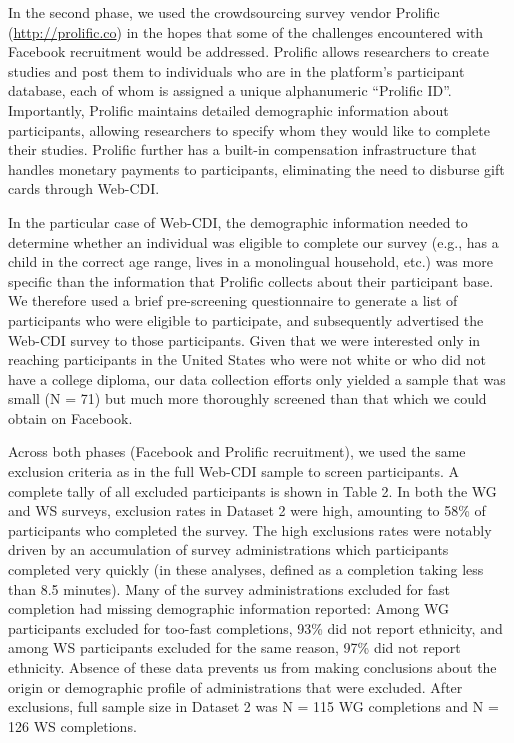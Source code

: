 \documentclass[
  english,
  ,man,floatsintext]{apa6}
\begin{document}
In the second phase, we used the crowdsourcing survey vendor Prolific (\url{http://prolific.co}) in the hopes that some of the challenges encountered with Facebook recruitment would be addressed. Prolific allows researchers to create studies and post them to individuals who are in the platform's participant database, each of whom is assigned a unique alphanumeric \enquote{Prolific ID}. Importantly, Prolific maintains detailed demographic information about participants, allowing researchers to specify whom they would like to complete their studies. Prolific further has a built-in compensation infrastructure that handles monetary payments to participants, eliminating the need to disburse gift cards through Web-CDI.

In the particular case of Web-CDI, the demographic information needed to determine whether an individual was eligible to complete our survey (e.g., has a child in the correct age range, lives in a monolingual household, etc.) was more specific than the information that Prolific collects about their participant base. We therefore used a brief pre-screening questionnaire to generate a list of participants who were eligible to participate, and subsequently advertised the Web-CDI survey to those participants. Given that we were interested only in reaching participants in the United States who were not white or who did not have a college diploma, our data collection efforts only yielded a sample that was small (N = 71) but much more thoroughly screened than that which we could obtain on Facebook.

Across both phases (Facebook and Prolific recruitment), we used the same exclusion criteria as in the full Web-CDI sample to screen participants. A complete tally of all excluded participants is shown in Table 2. In both the WG and WS surveys, exclusion rates in Dataset 2 were high, amounting to 58\% of participants who completed the survey. The high exclusions rates were notably driven by an accumulation of survey administrations which participants completed very quickly (in these analyses, defined as a completion taking less than 8.5 minutes). Many of the survey administrations excluded for fast completion had missing demographic information reported: Among WG participants excluded for too-fast completions, 93\% did not report ethnicity, and among WS participants excluded for the same reason, 97\% did not report ethnicity. Absence of these data prevents us from making conclusions about the origin or demographic profile of administrations that were excluded. After exclusions, full sample size in Dataset 2 was N = 115 WG completions and N = 126 WS completions.
\end{document}
